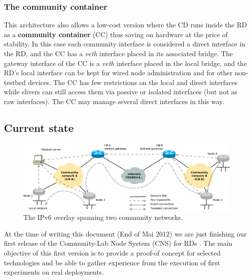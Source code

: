 \documentclass[conference]{IEEEtran}
\begin{document}

\subsubsection{The community container}

This architecture also allows a low-cost version where the CD runs inside the
RD as a \textbf{community container} (CC) thus saving on hardware at the price
of stability.  In this case each community interface is considered a direct
interface in the RD, and the CC has a \emph{veth} interface placed in its
associated bridge.  The gateway interface of the CC is a \emph{veth} interface
placed in the local bridge, and the RD's local interface can be kept for wired
node administration and for other non-testbed devices.  The CC has few
restrictions on the local and direct interfaces while slivers can still access
them via passive or isolated interfaces (but not as raw interfaces).  The CC
may manage several direct interfaces in this way.

\subsection{Current state}

\begin{figure}[!t]
\centering
\includegraphics[height=0.20\textheight]{ipv6-overlay}
\caption{The IPv6 overlay spanning two community networks.}
\label{fig:ipv6-overlay}
\end{figure}






At the time of writing this document (End of Mai 2012) we are just
finishing our first release of the Community-Lab Node System (CNS) for RDs
\cite{a-hack}. The main objective of this first version is to provide
a proof-of concept for selected technologies and be able to gather
experience from the execution of first experiments on real
deployments.
\end{document}
